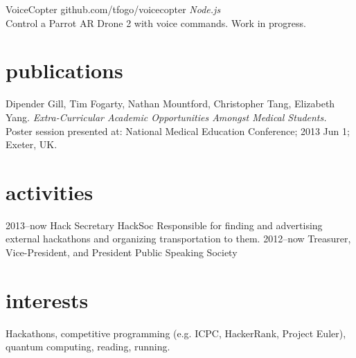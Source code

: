 \documentclass[]{friggeri-cv} %
\begin{document}
\begin{entrylist}
\entry
{}
{VoiceCopter}
{github.com/tfogo/voicecopter}
{\emph{Node.js} \\
Control a Parrot AR Drone 2 with voice commands. Work in progress.}
\end{entrylist}

\section{\color{brown}publications}

{Dipender Gill, Tim Fogarty, Nathan Mountford, Christopher Tang, Elizabeth Yang. \emph{Extra-Curricular Academic Opportunities Amongst Medical Students.} Poster session presented at: National Medical Education Conference; 2013 Jun 1; Exeter, UK.}

\newpage

\section{\color{green}activities}

\begin{entrylist}
\entry
{2013--now}
{Hack Secretary}
{HackSoc}
{Responsible for finding and advertising external hackathons and organizing transportation to them.}
\entry
{2012--now}
{Treasurer, Vice-President, and President}
{Public Speaking Society}
{}
\end{entrylist}


\section{\color{purple}interests}

Hackathons, competitive programming (e.g. ICPC, HackerRank, Project Euler), quantum computing, reading, running.
\end{document}
